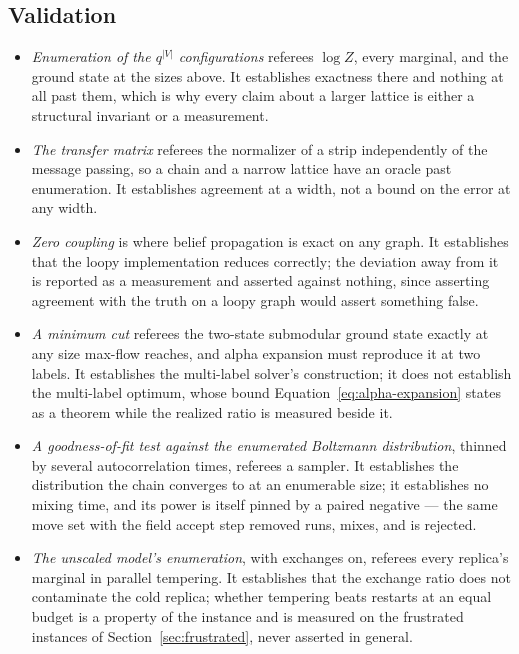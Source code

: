 \documentclass[11pt,a4paper]{article}
\begin{document}
\subsection{Validation}
\label{sec:potts:validation}
\begin{itemize}
  \item \emph{Enumeration of the $q^{|V|}$ configurations} referees $\log Z$,
    every marginal, and the ground state at the sizes above. It establishes
    exactness there and nothing at all past them, which is why every claim
    about a larger lattice is either a structural invariant or a measurement.
  \item \emph{The transfer matrix} referees the normalizer of a strip
    independently of the message passing, so a chain and a narrow lattice have
    an oracle past enumeration. It establishes agreement at a width, not a
    bound on the error at any width.
  \item \emph{Zero coupling} is where belief propagation is exact on any graph.
    It establishes that the loopy implementation reduces correctly; the
    deviation away from it is reported as a measurement and asserted against
    nothing, since asserting agreement with the truth on a loopy graph would
    assert something false.
  \item \emph{A minimum cut} referees the two-state submodular ground state
    exactly at any size max-flow reaches, and alpha expansion must reproduce
    it at two labels. It establishes the multi-label solver's construction; it
    does not establish the multi-label optimum, whose bound
    Equation~\ref{eq:alpha-expansion} states as a theorem while the realized
    ratio is measured beside it.
  \item \emph{A goodness-of-fit test against the enumerated Boltzmann
    distribution}, thinned by several autocorrelation times, referees a
    sampler. It establishes the distribution the chain converges to at an
    enumerable size; it establishes no mixing time, and its power is itself
    pinned by a paired negative --- the same move set with the field accept
    step removed runs, mixes, and is rejected.
  \item \emph{The unscaled model's enumeration}, with exchanges on, referees
    every replica's marginal in parallel tempering. It establishes that the
    exchange ratio does not contaminate the cold replica; whether tempering
    beats restarts at an equal budget is a property of the instance and is
    measured on the frustrated instances of Section~\ref{sec:frustrated},
    never asserted in general.
\end{itemize}
\end{document}
